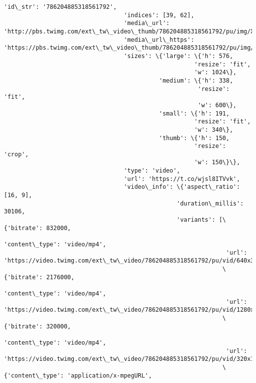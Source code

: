 \documentclass[11pt]{article}
\begin{document}
\begin{Verbatim}[commandchars=\\\{\}]
                                  'id\_str': '786204885318561792',
                                  'indices': [39, 62],
                                  'media\_url': 'http://pbs.twimg.com/ext\_tw\_video\_thumb/786204885318561792/pu/img/XqMoixLm83FzkAbn.jpg',
                                  'media\_url\_https': 'https://pbs.twimg.com/ext\_tw\_video\_thumb/786204885318561792/pu/img/XqMoixLm83FzkAbn.jpg',
                                  'sizes': \{'large': \{'h': 576,
                                                      'resize': 'fit',
                                                      'w': 1024\},
                                            'medium': \{'h': 338,
                                                       'resize': 'fit',
                                                       'w': 600\},
                                            'small': \{'h': 191,
                                                      'resize': 'fit',
                                                      'w': 340\},
                                            'thumb': \{'h': 150,
                                                      'resize': 'crop',
                                                      'w': 150\}\},
                                  'type': 'video',
                                  'url': 'https://t.co/wjsl8ITVvk',
                                  'video\_info': \{'aspect\_ratio': [16, 9],
                                                 'duration\_millis': 30106,
                                                 'variants': [\{'bitrate': 832000,
                                                               'content\_type': 'video/mp4',
                                                               'url': 'https://video.twimg.com/ext\_tw\_video/786204885318561792/pu/vid/640x360/6vt24D3ZQSvYuDqe.mp4'\},
                                                              \{'bitrate': 2176000,
                                                               'content\_type': 'video/mp4',
                                                               'url': 'https://video.twimg.com/ext\_tw\_video/786204885318561792/pu/vid/1280x720/rSbgQdvR9TPIlRWr.mp4'\},
                                                              \{'bitrate': 320000,
                                                               'content\_type': 'video/mp4',
                                                               'url': 'https://video.twimg.com/ext\_tw\_video/786204885318561792/pu/vid/320x180/JuNJDqr1KHqoP83N.mp4'\},
                                                              \{'content\_type': 'application/x-mpegURL',

\end{Verbatim}
\end{document}
